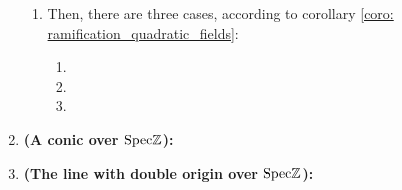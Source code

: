 \begin{example}
\begin{enumerate}
\begin{enumerate}
                                \item Then, there are three cases, according to corollary \ref{coro: ramification_quadratic_fields}:
                                    \begin{enumerate}
                                        \item 
                                        \item
                                        \item
                                    \end{enumerate}
                            \end{enumerate}
                        \item \textbf{(A conic over $\mathrm{Spec} \mathbb{Z}$):}
                        \item \textbf{(The line with double origin over $\mathrm{Spec} \mathbb{Z}$):}
                    \end{enumerate}
                \end{example}
                
